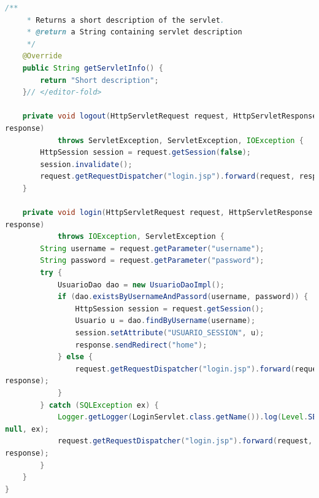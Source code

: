\documentclass[a4paper,12pt]{article}
\begin{document}
\begin{lstlisting}[language=Java, style=customJava, 
caption={LoginServlet.java}, captionpos=b,basicstyle=\fontfamily{cmss}\small]
    /** 
     * Returns a short description of the servlet.
     * @return a String containing servlet description
     */
    @Override
    public String getServletInfo() {
        return "Short description";
    }// </editor-fold>

    private void logout(HttpServletRequest request, HttpServletResponse 
response) 
            throws ServletException, ServletException, IOException {
        HttpSession session = request.getSession(false);
        session.invalidate();
        request.getRequestDispatcher("login.jsp").forward(request, response);
    }

    private void login(HttpServletRequest request, HttpServletResponse 
response) 
            throws IOException, ServletException {
        String username = request.getParameter("username");
        String password = request.getParameter("password");
        try {
            UsuarioDao dao = new UsuarioDaoImpl();
            if (dao.existsByUsernameAndPassord(username, password)) {
                HttpSession session = request.getSession();
                Usuario u = dao.findByUsername(username);
                session.setAttribute("USUARIO_SESSION", u);
                response.sendRedirect("home");
            } else {
                request.getRequestDispatcher("login.jsp").forward(request, 
response);
            }
        } catch (SQLException ex) {
            Logger.getLogger(LoginServlet.class.getName()).log(Level.SEVERE, 
null, ex);
            request.getRequestDispatcher("login.jsp").forward(request, 
response);
        }
    }
}
\end{lstlisting}
\end{document}
